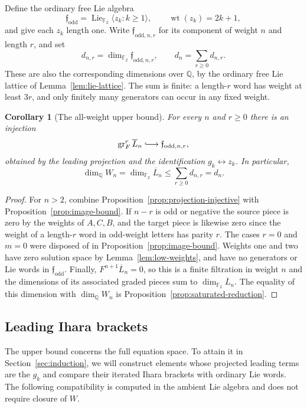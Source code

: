 \documentclass[11pt]{article}
\newcommand{\Q}{\mathbb Q}
\newcommand{\F}{{\mathbb F_2}}
\newcommand{\Lie}{\operatorname{Lie}}
\DeclareMathOperator{\wt}{wt}
\newtheorem{corollary}[theorem]{Corollary}
\theoremstyle{definition}
\theoremstyle{remark}
\numberwithin{equation}{section}
\begin{document}
Define the ordinary free Lie algebra
\[
 \mathfrak f_{\mathrm{odd}}
   =\Lie_{\F}\langle z_k:k\geq1\rangle,
 \qquad \wt(z_k)=2k+1,
\]
and give each $z_k$ length one.
Write $\mathfrak f_{\mathrm{odd},n,r}$ for its component of
weight $n$ and length $r$, and set
\begin{equation}
 \label{eq:free-dimensions}
 d_{n,r}=\dim_{\F}\mathfrak f_{\mathrm{odd},n,r},
 \qquad d_n=\sum_{r\geq0}d_{n,r}.
\end{equation}
These are also the corresponding dimensions over $\Q$, by
the ordinary free Lie lattice of Lemma~\ref{lem:lie-lattice}.
The sum is finite: a length-$r$ word has weight at least $3r$,
and only finitely many generators can occur in any fixed weight.

\begin{corollary}[The all-weight upper bound]
\label{cor:dimension-bound}
For every $n$ and $r\geq0$ there is an injection
\[
 \operatorname{gr}^r_F\overline L_n
 \lhook\joinrel\longrightarrow
 \mathfrak f_{\mathrm{odd},n,r},
\]
obtained by the leading projection and the identification
$g_k\leftrightarrow z_k$.  In particular,
\begin{equation}
 \label{eq:dimension-upper-bound}
 \dim_{\Q}W_n
 =\dim_{\F}\overline L_n
 \leq\sum_{r\geq0}d_{n,r}=d_n.
\end{equation}
\end{corollary}

\begin{proof}
For $n>2$, combine Proposition~\ref{prop:projection-injective}
with Proposition~\ref{prop:image-bound}.
If $n-r$ is odd or negative the source piece is zero by the
weights of $A,C,B$, and the target piece is likewise zero since
the weight of a length-$r$ word in odd-weight letters has parity
$r$.  The cases $r=0$ and $m=0$ were disposed of in
Proposition~\ref{prop:image-bound}.
Weights one and two have zero solution space by
Lemma~\ref{lem:low-weights}, and have no generators or Lie words
in $\mathfrak f_{\mathrm{odd}}$.
Finally, $F^{n+1}\overline L_n=0$, so this is a finite filtration
in weight $n$ and the dimensions of its associated graded pieces
sum to $\dim_{\F}\overline L_n$.
The equality of this dimension with $\dim_{\Q}W_n$ is
Proposition~\ref{prop:saturated-reduction}.
\end{proof}

\subsection{Leading Ihara brackets}
The upper bound concerns the full equation space.  To attain it in
Section~\ref{sec:induction}, we will construct elements whose projected
leading terms are the $g_k$ and compare their iterated Ihara brackets
with ordinary Lie words.  The following compatibility is computed in
the ambient Lie algebra and does not require closure of $W$.
\end{document}
